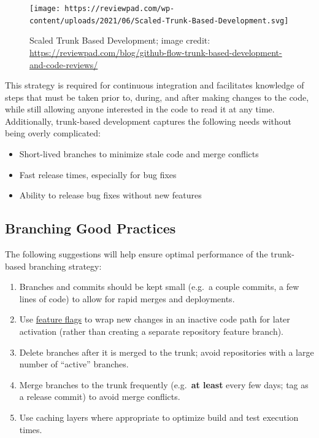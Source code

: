 \documentclass[
]{book}
\providecommand{\tightlist}{%
  \setlength{\itemsep}{0pt}\setlength{\parskip}{0pt}}
\begin{document}
\begin{figure}
\centering
\texttt{[image: https://reviewpad.com/wp-content/uploads/2021/06/Scaled-Trunk-Based-Development.svg]}
\caption{Scaled Trunk Based Development; image credit: \url{https://reviewpad.com/blog/github-flow-trunk-based-development-and-code-reviews/}}
\end{figure}

This strategy is required for continuous integration and facilitates knowledge of steps that must be taken prior to, during, and after making changes to the code, while still allowing anyone interested in the code to read it at any time. Additionally, trunk-based development captures the following needs without being overly complicated:

\begin{itemize}
\tightlist
\item
  Short-lived branches to minimize stale code and merge conflicts
\item
  Fast release times, especially for bug fixes
\item
  Ability to release bug fixes without new features
\end{itemize}

\hypertarget{branching-good-practices}{%
\subsection{Branching Good Practices}\label{branching-good-practices}}

The following suggestions will help ensure optimal performance of the trunk-based branching strategy:

\begin{enumerate}
\def\labelenumi{\arabic{enumi}.}
\tightlist
\item
  Branches and commits should be kept small (e.g.~a couple commits, a few lines of code) to allow for rapid merges and deployments.
\item
  Use \href{https://martinfowler.com/articles/feature-toggles.html}{feature flags} to wrap new changes in an inactive code path for later activation (rather than creating a separate repository feature branch).
\item
  Delete branches after it is merged to the trunk; avoid repositories with a large number of ``active'' branches.
\item
  Merge branches to the trunk frequently (e.g.~\textbf{at least} every few days; tag as a release commit) to avoid merge conflicts.
\item
  Use caching layers where appropriate to optimize build and test execution times.
\end{enumerate}
\end{document}
